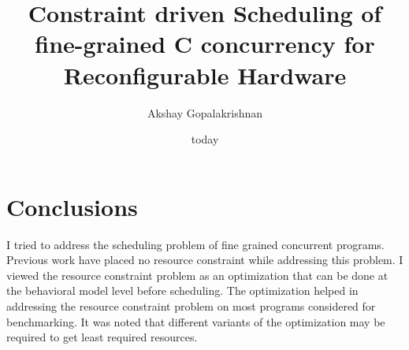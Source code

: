 \documentclass[sigplan,10pt,review]{acmart}
\title{Constraint driven Scheduling of fine-grained C concurrency for Reconfigurable Hardware}
\author{Akshay Gopalakrishnan}
\affiliation{McGill University}
\date{today}
\begin{document}
    \maketitle 

    

    

    

    

    

    

    \section{Conclusions}
    I tried to address the scheduling problem of fine grained concurrent programs. 
    Previous work have placed no resource constraint while addressing this problem.
    I viewed the resource constraint problem as an optimization that can be done at the behavioral model level before scheduling.
    The optimization helped in addressing the resource constraint problem on most programs considered for benchmarking. 
    It was noted that different variants of the optimization may be required to get least required resources.


    
    
\end{document}

